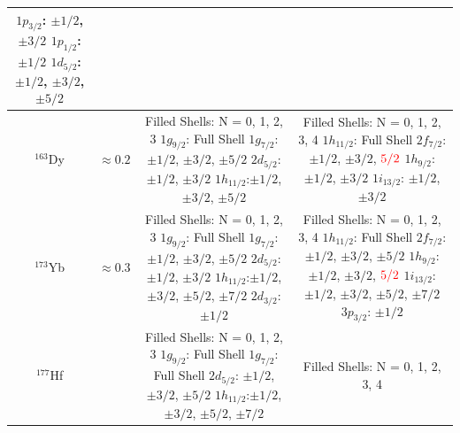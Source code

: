 \documentclass[10pt,a4paper, twoside]{report}
\begin{document}
\begin{table}[htbp]
\begin{adjustwidth}{-3cm}{-3cm}
\begin{tabular}{|c|c|c|c|}
{    $1p_{3/2}$: $\pm 1/2$, $\pm 3/2$ \\
    $1p_{1/2}$: $\pm 1/2$ \\
    $1d_{5/2}$: $\pm 1/2$, $\pm 3/2$, $\pm 5/2$}\\
\midrule
$^{163}$Dy & $\approx 0.2$ 
    &  \pbox{20cm}{Filled Shells: N = 0, 1, 2, 3 \\
    $1g_{9/2}$: Full Shell \\
    $1g_{7/2}$: $\pm 1/2$, $\pm 3/2$, $\pm 5/2$ \\
    $2d_{5/2}$: $\pm 1/2$, $\pm 3/2$ \\
    $1h_{11/2}$:$\pm 1/2$, $\pm 3/2$, $\pm 5/2$}              
    &  \pbox{20cm}{Filled Shells: N = 0, 1, 2, 3, 4 \\
    $1h_{11/2}$: Full Shell \\
    $2f_{7/2}$: $\pm 1/2$, $\pm 3/2$, $\textcolor{red}{5/2}$ \\
    $1h_{9/2}$: $\pm 1/2$, $\pm 3/2$ \\
    $1i_{13/2}$: $\pm 1/2$, $\pm 3/2$} \\
\midrule
$^{173}$Yb & $\approx 0.3$
    &  \pbox{20cm}{Filled Shells: N = 0, 1, 2, 3 \\
    $1g_{9/2}$: Full Shell \\
    $1g_{7/2}$: $\pm 1/2$, $\pm 3/2$, $\pm 5/2$ \\
    $2d_{5/2}$: $\pm 1/2$, $\pm 3/2$ \\
    $1h_{11/2}$:$\pm 1/2$, $\pm 3/2$, $\pm 5/2$, $\pm 7/2$ \\
    $2d_{3/2}$: $\pm 1/2$}              
    &  \pbox{20cm}{Filled Shells: N = 0, 1, 2, 3, 4 \\
    $1h_{11/2}$: Full Shell \\
    $2f_{7/2}$: $\pm 1/2$, $\pm 3/2$, $\pm 5/2$ \\
    $1h_{9/2}$: $\pm 1/2$, $\pm 3/2$, $\textcolor{red}{5/2}$ \\
    $1i_{13/2}$:$\pm 1/2$, $\pm 3/2$, $\pm 5/2$, $\pm 7/2$ \\
    $3p_{3/2}$: $\pm 1/2$} \\
\midrule
$^{177}$Hf &
    &  \pbox{20cm}{Filled Shells: N = 0, 1, 2, 3 \\
    $1g_{9/2}$: Full Shell \\
    $1g_{7/2}$: Full Shell \\
    $2d_{5/2}$: $\pm 1/2$, $\pm 3/2$, $\pm 5/2$ \\
    $1h_{11/2}$:$\pm 1/2$, $\pm 3/2$, $\pm 5/2$, $\pm 7/2$}              
    &  \pbox{20cm}{Filled Shells: N = 0, 1, 2, 3, 4 \\
}
\end{tabular}
\end{adjustwidth}
\end{table}
\end{document}

